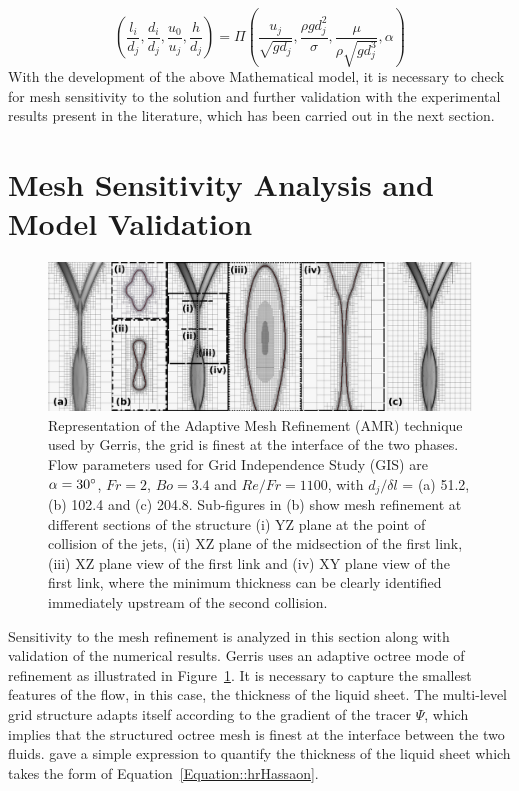 \documentclass[%
aip,
sd,%
amsmath,amssymb,
preprint,%
author-year,%
]{revtex4-1}
\begin{document}
\begin{equation}\label{Equation::Pi}
\left(\frac{l_i}{d_j},\frac{d_i}{d_j},\frac{u_0}{u_j},\frac{h}{d_j}\right) = \Pi\left(\frac{u_j}{\sqrt{gd_j}},\frac{\rho gd_j^2}{\sigma},\frac{\mu}{\rho\sqrt{gd_j^3}},\alpha\right)
\end{equation}
With the development of the above Mathematical model, it is necessary to check for mesh sensitivity to the solution and further validation with the experimental results present in the literature, which has been carried out in the next section.

\section{ Mesh Sensitivity Analysis and Model Validation}\label{section::valid}
\begin{figure}
	\centering
	\includegraphics[width=\linewidth]{figGIS}
	\caption{Representation of the Adaptive Mesh Refinement (AMR) technique used by Gerris, the grid is finest at the interface of the two phases. Flow parameters used for Grid Independence Study (GIS) are $\alpha = 30\degree$, $Fr = 2$, $Bo = 3.4$ and $Re/Fr = 1100$, with $d_j/\delta l$ = (a) 51.2,(b) 102.4 and (c) 204.8. Sub-figures in (b) show mesh refinement at different sections of the structure (i) YZ plane at the point of collision of the jets, (ii) XZ plane of the midsection of the first link, (iii) XZ plane view of the first link and (iv) XY plane view of the first link, where the minimum thickness can be clearly identified immediately upstream of the second collision.}
	\label{Figure::GISfigures}
\end{figure}
Sensitivity to the mesh refinement is analyzed in this section along with validation of the numerical results. Gerris uses an adaptive octree mode of refinement as illustrated in Figure~\ref{Figure::GISfigures}. It is necessary to capture the smallest features of the flow, in this case, the thickness of the liquid sheet. The multi-level grid structure adapts itself according to the gradient of the tracer $\Psi$, which implies that the structured octree mesh is finest at the interface between the two fluids. \cite{hasson1964thickness} gave a simple expression to quantify the thickness of the liquid sheet which takes the form of Equation~\ref{Equation::hrHassaon}.
\end{document}
